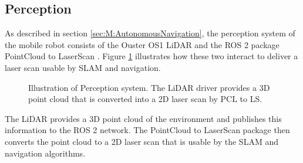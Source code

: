 
\subsection{Perception}\label{sec:M:AN:Perception}
As described in section \ref{sec:M:AutonomousNavigation}, the perception system of the mobile robot consists of the Ouster OS1 LiDAR and the ROS 2 package PointCloud to LaserScan \cite{pointcloud_to_laserscan_repo}. Figure \ref{fig:M:AN:P:Perception} illustrates how these two interact to deliver a laser scan usable by SLAM and navigation.

\begin{figure}[htp!]
    \fontsize{9}{14}\selectfont
    \centering
    
    \caption{Illustration of Perception system. The LiDAR driver provides a 3D point cloud that is converted into a 2D laser scan by PCL to LS.}
    \label{fig:M:AN:P:Perception}
\end{figure}

The LiDAR provides a 3D point cloud of the environment and publishes this information to the ROS 2 network. The PointCloud to LaserScan package then converts the point cloud to a 2D laser scan that is usable by the SLAM and navigation algorithms.

